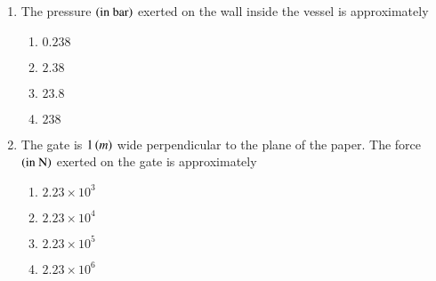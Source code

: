 \documentclass[journal,15pt,onecolumn]{IEEEtran}
\theoremstyle{remark}
\begin{document}
\begin{enumerate}[start=6]
\begin{figure}[!ht]
\label{fig:my_label}
\end{figure}
\item The pressure $\left(\text{in bar}\right)$ exerted on the wall inside the vessel is approximately
\begin{enumerate}
    \item $0.238$
    \item $2.38$
    \item $23.8$
    \item $238$
\end{enumerate}
\item The gate is $1 \left(m\right)$ wide perpendicular to the plane of the paper. The force $\left(\text{in N}\right)$ exerted on the gate is approximately
\begin{enumerate}
    \item $2.23\times10^3$
    \item $2.23\times10^4$
    \item $2.23\times10^5$
    \item $2.23\times10^6$
\end{enumerate}
\end{enumerate}
\end{document}
